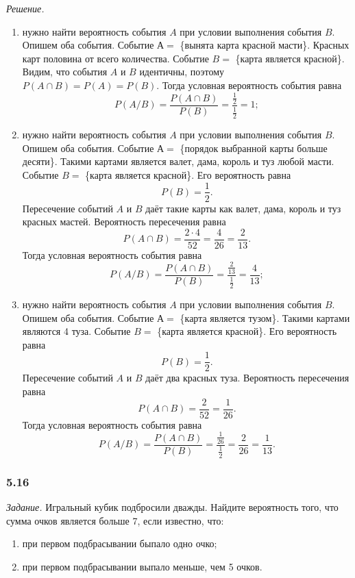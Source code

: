 \textit{Решение.} 
\begin{enumerate}[label=\alph*)]
\item нужно найти вероятность события $A$ при условии выполнения события $B$.
Опишем оба события.
Событие $А =$ \{вынята карта красной масти\}.
Красных карт половина от всего количества.
Событие $B =$ \{карта является красной\}.
Видим, что события $A$ и $B$ идентичны, поэтому $P \left( A \cap B \right) = P \left( A \right) = P \left( B \right)$.
Тогда условная вероятность события равна
$$P \left( A/B \right) =
\frac{P \left( A \cap B \right)}{P \left( B \right) } =
\frac{ \frac{1}{2} }{ \frac{1}{2} } =
1;$$
\item нужно найти вероятность события $A$ при условии выполнения события $B$.
Опишем оба события.
Событие $А =$ \{порядок выбранной карты больше десяти\}.
Такими картами является валет, дама, король и туз любой масти.
Событие $B =$ \{карта является красной\}.
Его вероятность равна
$$P \left( B \right) =
\frac{1}{2}.$$
Пересечение событий $A$ и $B$ даёт такие карты как валет, дама, король и туз красных мастей.
Вероятность пересечения равна
$$P \left( A \cap B \right) =
\frac{2 \cdot 4}{52} =
\frac{4}{26} =
\frac{2}{13}.$$
Тогда условная вероятность события равна
$$P \left( A/B \right) =
\frac{P \left( A \cap B \right)}{P \left( B \right) } =
\frac{ \frac{2}{13} }{ \frac{1}{2} } =
\frac{4}{13};$$
\item нужно найти вероятность события $A$ при условии выполнения события $B$.
Опишем оба события.
Событие $А =$ \{карта является тузом\}.
Такими картами являются 4 туза.
Событие $B =$ \{карта является красной\}.
Его вероятность равна
$$P \left( B \right) =
\frac{1}{2}.$$
Пересечение событий $A$ и $B$ даёт два красных туза.
Вероятность пересечения равна
$$P \left( A \cap B \right) =
\frac{2}{52} =
\frac{1}{26}.$$
Тогда условная вероятность события равна
$$P \left( A/B \right) =
\frac{P \left( A \cap B \right)}{P \left( B \right) } =
\frac{ \frac{1}{26} }{ \frac{1}{2} } =
\frac{2}{26} =
\frac{1}{13}.$$
\end{enumerate}

\subsubsection*{5.16}

\textit{Задание.} Игральный кубик подбросили дважды.
Найдите вероятность того, что сумма очков является больше 7, если известно, что:

\begin{enumerate}[label=\alph*)]
\item при первом подбрасывании быпало одно очко;
\item при первом подбрасывании выпало меньше, чем 5 очков.
\end{enumerate}


